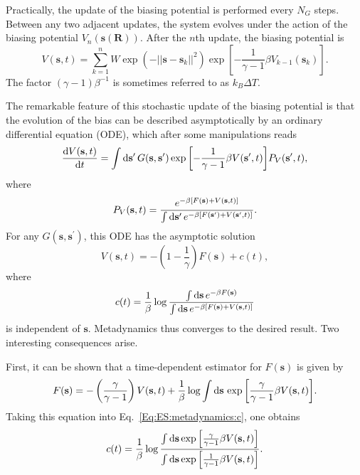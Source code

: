 Practically, the update of the biasing potential is performed every $N_G$ steps. Between any two adjacent updates, the system evolves under the action of the biasing potential $V_n(\mathbf{s}(\mathbf{R}))$. After the $n$th update, the biasing potential is
\begin{equation}
    V(\mathbf{s},t)=\sum_{k=1}^n W\exp{\left(-||\mathbf{s}-\mathbf{s}_k||^2\right)}\exp{\left[-\frac{1}{\gamma-1}\beta V_{k-1}(\mathbf{s}_k)\right]}.
\end{equation}
The factor $(\gamma-1)\beta^{-1}$ is sometimes referred to as $k_B\Delta T$.

The remarkable feature of this stochastic update of the biasing potential is that the evolution of the bias can be described asymptotically by an ordinary differential equation (ODE), which after some manipulations reads
\begin{equation}
    \frac{\mathop{}\!\mathrm{d} V(\mathbf{s},t)}{\mathop{}\!\mathrm{d} t}=\int \mathop{}\!\mathrm{d} \mathbf{s}^\prime\, G(\mathbf{s},\mathbf{s}^\prime)\exp{\left[-\frac{1}{\gamma-1}\beta V(\mathbf{s}^\prime,t)\right]}P_V(\mathbf{s}^\prime,t),
\end{equation}
where
\begin{equation}
    P_V(\mathbf{s},t)=\frac{e^{-\beta[F(\mathbf{s})+V(\mathbf{s},t)]}}{\int \mathop{}\!\mathrm{d} \mathbf{s}^\prime\, e^{-\beta[F(\mathbf{s}^\prime)+V(\mathbf{s}^\prime,t)]}}.
\end{equation}
For any $G(\mathbf{s},\mathbf{s}^\prime)$, this ODE has the asymptotic solution
\begin{equation}
    V(\mathbf{s},t)=-\left(1-\frac{1}{\gamma}\right)F(\mathbf{s})+c(t),
\end{equation}
where
\begin{equation}
    c(t)=\frac{1}{\beta}\log{\frac{\int \mathop{}\!\mathrm{d}\mathbf{s}\, e^{-\beta F(\mathbf{s})}}{\int \mathop{}\!\mathrm{d}\mathbf{s}\, e^{-\beta \left[F(\mathbf{s})+V(\mathbf{s},t)\right]}}}
    \label{Eq:ES:metadynamics:c}
\end{equation}
is independent of $\mathbf{s}$. Metadynamics thus converges to the desired result. Two interesting consequences arise.

First, it can be shown that a time-dependent estimator for $F(\mathbf{s})$ is given by\cite{TiwaryJPCB2015}
\begin{equation}
    F(\mathbf{s})=-\left(\frac{\gamma}{\gamma -1}\right)V(\mathbf{s},t)+\frac{1}{\beta}\log{\int \mathop{}\!\mathrm{d}\mathbf{s}\, \exp{\left[\frac{\gamma}{\gamma-1}\beta V(\mathbf{s},t)\right]}}.
\end{equation}
Taking this equation into Eq.~\ref{Eq:ES:metadynamics:c}, one obtains
\begin{equation}
    c(t)=\frac{1}{\beta}\log{\frac{\int \mathop{}\!\mathrm{d}\mathbf{s}\exp{\left[\frac{\gamma}{\gamma-1}\beta V(\mathbf{s},t)\right]}}{\int \mathop{}\!\mathrm{d}\mathbf{s}\exp{\left[\frac{1}{\gamma-1}\beta V(\mathbf{s},t)\right]}}}.
\end{equation}

